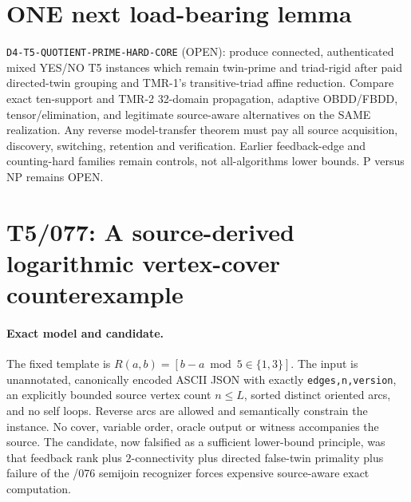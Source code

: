 \documentclass[11pt]{article}
\begin{document}
\section{ONE next load-bearing lemma}
\texttt{D4-T5-QUOTIENT-PRIME-HARD-CORE} (OPEN):
produce connected, authenticated mixed YES/NO T5 instances which
remain twin-prime and triad-rigid after paid directed-twin grouping
and TMR-1's transitive-triad affine reduction. Compare exact
ten-support and TMR-2 32-domain propagation, adaptive OBDD/FBDD,
tensor/elimination, and legitimate source-aware alternatives on the
SAME realization. Any reverse model-transfer theorem must pay all
source acquisition, discovery, switching, retention and verification.
Earlier feedback-edge and counting-hard families remain controls,
not all-algorithms lower bounds. P versus NP remains OPEN.


\section{T5/077: A source-derived logarithmic vertex-cover counterexample}
\paragraph{Exact model and candidate.}
The fixed template is $R(a,b)=[b-a\bmod5\in\{1,3\}]$.
The input is unannotated, canonically encoded ASCII JSON with exactly
\texttt{edges,n,version}, an explicitly bounded source vertex count
$n\le L$, sorted distinct oriented arcs, and no self loops.
Reverse arcs are allowed and semantically constrain the instance.
No cover, variable order, oracle output or witness accompanies the source.
The candidate, now falsified as a sufficient lower-bound principle,
was that feedback rank plus $2$-connectivity plus directed false-twin
primality plus failure of the /076 semijoin recognizer forces expensive
source-aware exact computation.
\end{document}
